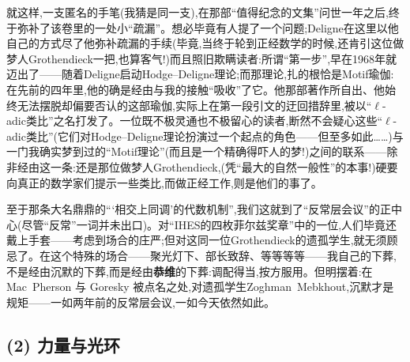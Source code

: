 就这样,一支匿名的手笔(我猜是同一支),在那部“值得纪念的文集”问世一年之后,终于弥补了该卷里的一处小“疏漏”。想必毕竟有人提了一个问题;Deligne在这里以他自己的方式尽了他弥补疏漏的手续(毕竟,当终于轮到正经数学的时候,还肯引这位做梦人\dmark{}Grothendieck一把,也算客气!)而且照旧欺瞒读者:所谓“第一步”,早在1968年就迈出了——随着Deligne启动Hodge--Deligne理论;而那理论,扎的根恰是Motif瑜伽:在先前的四年里,他的确是经由与我的接触“吸收”了它。他那部著作所自出、他始终无法摆脱却偏要否认的这部瑜伽,实际上在第一段引文的迂回措辞里,被以“$\ell$-adic类比”之名打发了。一位既不极灵通也不极留心的读者,断然不会疑心这些“$\ell$-adic类比”(它们对Hodge--Deligne理论扮演过一个起点的角色——但至多如此……)与一门我确实梦到过的“Motif理论”(而且是一个精确得吓人的梦!)之间的联系——除非经由这一条:还是那位做梦人Grothendieck,(凭“最大的自然一般性”的本事!)硬要向真正的数学家们提示一些类比,而做正经工作,则是他们的事了。

至于那条大名鼎鼎的“‘相交上同调’的代数机制”,我们这就到了“反常层会议”的正中心(尽管“反常”一词并未出口)。对“IHES的四枚菲尔兹奖章”中的一位\dmark{},人们毕竟还戴上手套——考虑到场合的庄严;但对这同一位Grothendieck的遗孤学生,就无须顾忌了。在这个特殊的场合——聚光灯下、部长致辞、等等等等——我自己的下葬,不是经由沉默的下葬,而是经由\textbf{恭维}的下葬:调配得当,按方服用。但明摆着:在 Mac~Pherson 与 Goresky 被点名之处,对遗孤学生Zoghman~Mebkhout,沉默才是规矩——一如两年前的反常层会议,一如今天依然如此。

\subsection{(2) 力量与光环}
\label{ch18:local:h3}

\label{ch18:local:n2}

